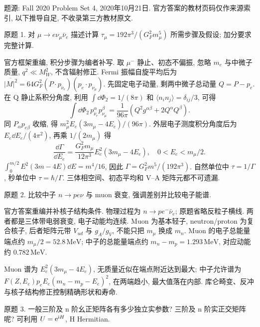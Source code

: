 题源: Fall 2020 Problem Set 4, 2020年10月21日. 官方答案的教材页码仅作来源索引, 以下推导自足, 不收录第三方教材原文.
\begin{exercise}\label{ex:8701-4-1}
原题 1. 对 $\mu\to e\nu_\mu\bar\nu_e$ 描述计算 $\tau_\mu=192\pi^3/(G_F^2m_\mu^5)$ 所需步骤及假设; 加分要求完整计算.
\end{exercise}
\begin{solution}
官方框架重编, 积分步骤为编者补写. 取 $\mu^-$ 静止、初态不偏振, 忽略 $m_e$ 与中微子质量, $q^2\ll M_W^2$, 不含辐射修正. Fermi 振幅自旋平均后为
$\overline{|M|^2}=64G_F^2(P\cdot p_{\bar\nu_e})(p_e\cdot p_{\nu_\mu})$.
先固定电子动量, 剩两中微子总动量 $Q=P-p_e$. 在 Q 静止系积分角度, 利用 $\int\dd\Phi_2=1/(8\pi)$ 和 $\langle n_in_j\rangle=\delta_{ij}/3$, 可得
\begin{equation}
 \int\dd\Phi_2\,p_{\bar\nu_e}^{\alpha}p_{\nu_\mu}^{\beta}
 =\frac1{96\pi}(Q^2g^{\alpha\beta}+2Q^\alpha Q^\beta).
\end{equation}
同 $P_\alpha p_{e\beta}$ 收缩, 得 $m_\mu^2E_e(3m_\mu-4E_e)/(96\pi)$. 外层电子测度积分角度后为 $E_e\dd E_e/(4\pi^2)$, 再乘 $1/(2m_\mu)$ 得
\begin{equation}
 \frac{\dd\Gamma}{\dd E_e}=\frac{G_F^2m_\mu}{12\pi^3}E_e^2(3m_\mu-4E_e),\quad0<E_e<m_\mu/2.
\end{equation}
$\int_0^{m/2}E^2(3m-4E)\dd E=m^4/16$, 因此 $\Gamma=G_F^2m^5/(192\pi^3)$. 自然单位中 $\tau=1/\Gamma$, 秒单位中 $\tau=\hbar/\Gamma$. 三体相空间、初态平均和 V--A 矩阵元都不可遗漏.
\end{solution}
\begin{exercise}\label{ex:8701-4-2}
原题 2. 比较中子 $n\to p e\nu$ 与 muon 衰变, 强调差别并比较电子能谱.
\end{exercise}
\begin{solution}
官方答案重编并补核子结构条件. 物理过程为 $n\to p e^-\bar\nu_e$; 原题省略反粒子横线. 两者都是三体带电弱衰变, 电子动能均连续. Muon 为基本轻子, neutron/proton 为复合核子, 后者矩阵元带 $V_{ud}$ 与 $g_A/g_V$, 不能只把 $m_\mu$ 换成 $m_n$. Muon 的电子总能量端点约 $m_\mu/2=52.8\,\mathrm{MeV}$; 中子的总能量端点约 $m_n-m_p=1.293\,\mathrm{MeV}$, 对应动能约 $0.782\,\mathrm{MeV}$.

Muon 谱为 $E_e^2(3m_\mu-4E_e)$, 无质量近似在端点附近达到最大; 中子允许谱为 $F(Z,E_e)p_eE_e(m_n-m_p-E_e)^2$, 在两端趋小, 最大值落在内部. 库仑畸变、反冲与核子结构修正控制精确形状和寿命.
\end{solution}
\begin{exercise}\label{ex:8701-4-3}
原题 3. 一般三阶及 n 阶幺正矩阵各有多少独立实参数? 三阶及 n 阶实正交矩阵呢? 可利用 $U=\mathrm e^{\mathrm i H}$, H Hermitian.
\end{exercise}
